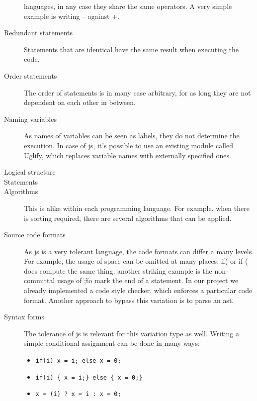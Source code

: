 \begin{description}
	languages, in any case they share the same operators. A very simple example is
	writing -- against +.
	\item[Redundant statements] Statements that are identical have the same result
	when executing the code.  
	\item[Order statements] The order of statements is in many case arbitrary, for
	as long they are not dependent on each other in between.
	\item[Naming variables] As names of variables can be seen as labels, they do
	not determine the execution. In case of \gls{js}, it's possible to use an
	existing module called Uglify, which replaces variable names with externally
	specified ones.
	\item[Logical structure] %
	\item[Statements]	%
  \item[Algorithms] This is alike within each programming language. For example,
  when there is sorting required, there are several algorithms that can be 
  applied.
  \item[Source code formats] As \gls{js} is a very tolerant language, the
  code formats can differ a many levels. For example, the usage of space can be
  omitted at many places: if( or if ( does compute the same thing, another
  striking example is the non-committal usage of \";\" to mark the end
  of a statement. In our project we already implemented a code style checker, 
  which enforces a particular code format. Another approach to bypass this 
  variation is to parse an \gls{ast}.
  \item[Syntax forms] The tolerance of \gls{js} is relevant for this variation
  type as well. Writing a simple conditional assignment can be done in many 
  ways:
  \begin{itemize}
    \item

\begin{lstlisting}
if(i) x = i; else x = 0;
\end{lstlisting}

    \item

\begin{lstlisting}
if(i) { x = i;} else { x = 0;}
\end{lstlisting}

    \item

\begin{lstlisting}
x = (i) ? x = i : x = 0;
\end{lstlisting}


\end{itemize}
\end{description}
